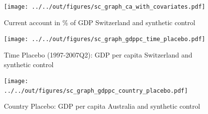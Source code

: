 \documentclass[10pt, a4paper]{article}
\begin{document}
\begin{figure}
	\caption{Current account in \% of GDP Switzerland and synthetic control}
	
	\texttt{[image: ../../out/figures/sc\_graph\_ca\_with\_covariates.pdf]}
	
\end{figure}

\begin{subfigures}
	\begin{figure}
		\caption{Time Placebo (1997-2007Q2): GDP per capita Switzerland and synthetic control}
		
		\texttt{[image: ../../out/figures/sc\_graph\_gdppc\_time\_placebo.pdf]}
		
	\end{figure}
	
	\begin{figure}
		\caption{Country Placebo: GDP per capita Australia and synthetic control}
		
		\texttt{[image: ../../out/figures/sc\_graph\_gdppc\_country\_placebo.pdf]}
		
	\end{figure}
	
\end{subfigures}



\clearpage


\printbibliography
{}
\end{document}
